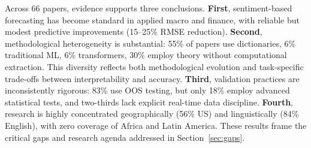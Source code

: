 Across 66 papers, evidence supports three conclusions. \textbf{First}, sentiment-based forecasting has become standard in applied macro and finance, with reliable but modest predictive improvements (15--25\% RMSE reduction). \textbf{Second}, methodological heterogeneity is substantial: 55\% of papers use dictionaries, 6\% traditional ML, 6\% transformers, 30\% employ theory without computational extraction. This diversity reflects both methodological evolution and task-specific trade-offs between interpretability and accuracy. \textbf{Third}, validation practices are inconsistently rigorous: 83\% use OOS testing, but only 18\% employ advanced statistical tests, and two-thirds lack explicit real-time data discipline. \textbf{Fourth}, research is highly concentrated geographically (56\% US) and linguistically (84\% English), with zero coverage of Africa and Latin America. These results frame the critical gaps and research agenda addressed in Section~\ref{sec:gaps}.

